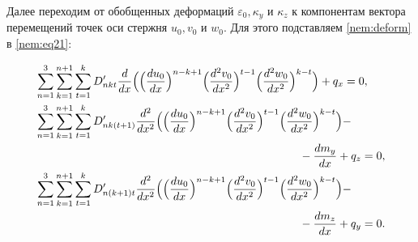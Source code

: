 Далее переходим от обобщенных деформаций $\varepsilon_0, \kappa_y$  и $\kappa_z$ к компонентам вектора перемещений точек оси стержня $u_0, v_0$  и $w_0$. Для этого подставляем \eqref{nem:deform} в \eqref{nem:eq21}:





\begin{equation}\label{nem:eq23}

\begin{aligned}

&\sum_{n=1}^3\sum_{k=1}^{n+1}\sum_{t=1}^k 

D_{nkt}^\prime\frac{d}{dx}

\Bigl(

\Bigl(\frac{du_0}{dx}\Bigr)^{n-k+1} 

\Bigl(\frac{d^2v_0}{dx^2}\Bigr)^{t-1} 

\Bigl(\frac{d^2w_0}{dx^2}\Bigr)^{k-t}\Bigr)+q_x=0,\\

%

&\sum_{n=1}^3\sum_{k=1}^{n+1}\sum_{t=1}^k 

D_{nk (t+1)}^\prime\frac{d^2}{dx^2}

\Bigl(

\Bigl(\frac{du_0}{dx}\Bigr)^{n-k+1}

\Bigl(\frac{d^2v_0}{dx^2}\Bigr)^{t-1}

\Bigl(\frac{d^2w_0}{dx^2}\Bigr)^{k-t}\Bigr)-

\\

& \hspace{8.2cm}

-\frac{dm_y}{dx}+q_z=0,\\

%

&\sum_{n=1}^3\sum_{k=1}^{n+1}\sum_{t=1}^k 

D_{n (k+1)t}^\prime\frac{d^2}{dx^2}

\Bigl(

\Bigl(\frac{du_0}{dx}\Bigr)^{n-k+1}

\Bigl(\frac{d^2v_0}{dx^2}\Bigr)^{t-1}

\Bigl(\frac{d^2w_0}{dx^2}\Bigr)^{k-t}\Bigr)- \\

& \hspace{8.2cm}

- \frac{dm_z}{dx}+q_y=0.

\end{aligned}

\end{equation}



